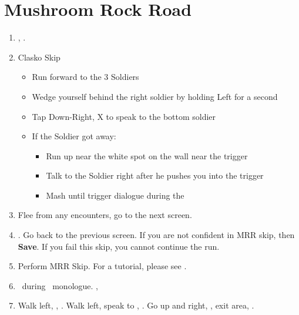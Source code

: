 \chapter{Mushroom Rock Road}

\begin{enumerate}
    \item \sd, \cs.
    \item Clasko Skip
    \begin{itemize}
        \item Run forward to the 3 Soldiers
        \item Wedge yourself behind the right soldier by holding Left for a second
        \item Tap Down-Right, X to speak to the bottom soldier
        \item If the Soldier got away:
        \begin{itemize}
            \item Run up near the white spot on the wall near the trigger
            \item Talk to the Soldier right after he pushes you into the trigger
            \item Mash until trigger dialogue during the \cs
        \end{itemize}
    \end{itemize}
    \item Flee from any encounters, go to the next screen.
    \item \save. Go back to the previous screen. If you are not confident in MRR skip, then \textbf{Save}. If you fail this skip, you cannot continue the run.
    \item Perform MRR Skip. For a tutorial, please see .
    \item \sd\ during \tidus\ monologue. \cs[1:00], \sd
    \item Walk left, \save, \sd. Walk left, speak to \auron, \sd. Go up and right, \sd, exit area, \sd.
\end{enumerate}
\bothvfill\winvfill\lossvfill
\ 
\bothcb\wincb\losscb
